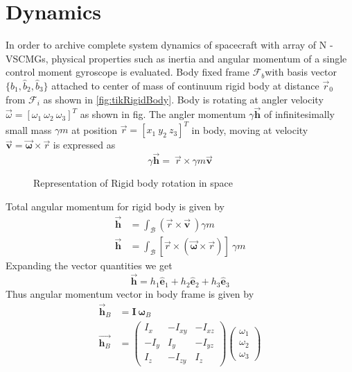 \section{Dynamics}
In order to archive complete system dynamics of spacecraft with array of N - VSCMGs, physical properties such as inertia and angular momentum of a single control moment gyroscope is evaluated. Body fixed frame $\displaystyle \mathcal{F}_{b}$with basis vector $\displaystyle \{\hat{b}_{1} ,\hat{b}_{2} ,\hat{b}_{3}\}$ attached to center of mass of continuum rigid body at distance $\displaystyle \vec{r}_{0}$ from $\displaystyle \mathcal{F}_{i}$ as shown in \autoref{fig:tikRigidBody}. Body is rotating at angler velocity $\displaystyle \vec{\omega } =[ \omega _{1} \ \omega _{2} \ \omega _{3}]^{T}$ as shown in fig. The angler momentum $\displaystyle \gamma \vec{\mathbf{h}}$ of infinitesimally small mass $\displaystyle \gamma m$ at position $\displaystyle \vec{r} =[ x_{1} \ y_{2} \ z_{3}]^{T}$ in body, moving at velocity $\displaystyle \mathbf{\vec{v}} =\vec{\mathbf{\omega }} \times \vec{r}$ is expressed as
\begin{equation*}
\gamma \vec{\mathbf{h}} =\ \vec{r} \times \gamma m\mathbf{\vec{v}}
\end{equation*}
\begin{figure}[!h]
    \centering
    
    \caption{Representation of Rigid body rotation in space}
    \label{fig:tikRigidBody}
\end{figure}
Total angular momentum for rigid body is given by
\begin{equation*}
\begin{aligned}
\vec{\mathbf{h}} & =\int _{\mathcal{B}}(\vec{r} \times \mathbf{\vec{v}} \ ) \gamma m\\
\vec{\mathbf{h}} & =\int _{\mathcal{B}}[\vec{r} \times (\vec{\mathbf{\omega }} \times \vec{r})] \ \gamma m
\end{aligned}
\end{equation*}
Expanding the vector quantities we get
\begin{equation*}
\vec{\mathbf{h}} =h_{1}\hat{\mathbf{e}}_{1} +h_{2}\hat{\mathbf{e}}_{2} +h_{3}\hat{\mathbf{e}}_{3}
\end{equation*}
Thus angular momentum vector in body frame is given by
\begin{equation}
\begin{aligned}
\vec{\mathbf{h}}_{B} & =\mathbf{I\ \omega }_{B}\\
\overrightarrow{\mathbf{h}_{B}} & =\begin{pmatrix}
I_{x} & -I_{xy} & -I_{xz}\\
-I_{y} & I_{y} & -I_{yz}\\
I_{z} & -I_{zy} & I_{z}
\end{pmatrix}\begin{pmatrix}
\omega _{1}\\
\omega _{2}\\
\omega _{3}
\end{pmatrix}
\end{aligned}
\end{equation}
